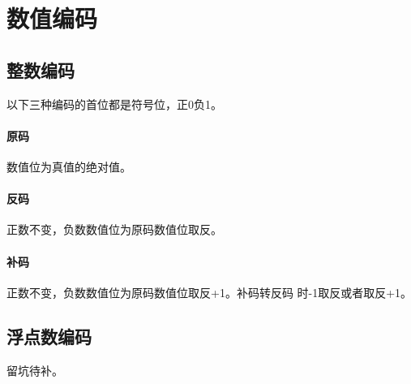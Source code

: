 \section{数值编码}
\subsection{整数编码}
以下三种编码的首位都是符号位，正0负1。
\paragraph{原码}数值位为真值的绝对值。
\paragraph{反码}正数不变，负数数值位为原码数值位取反。
\paragraph{补码}正数不变，负数数值位为原码数值位取反+1。补码转反码
时-1取反或者取反+1。
\subsection{浮点数编码}
留坑待补。
